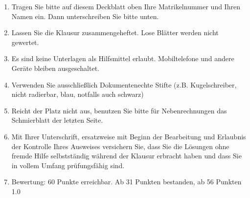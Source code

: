 		\begin{enumerate}
		\item Tragen Sie bitte auf diesem Deckblatt oben Ihre Matrikelnummer und Ihren Namen ein. Dann unterschreiben Sie bitte unten.
		\item Lassen Sie die Klausur zusammengeheftet. Lose Blätter werden nicht gewertet.
		\item Es sind keine Unterlagen als Hilfsmittel erlaubt. Mobiltelefone und andere Geräte bleiben ausgeschaltet.
		\item Verwenden Sie ausschließlich Dokumentenechte Stifte (z.B. Kugelschreiber, nicht radierbar, blau, notfalls auch schwarz)
		\item Reicht der Platz nicht aus, benutzen Sie bitte für Nebenrechnungen das Schmierblatt der letzten Seite.
		\item Mit Ihrer Unterschrift, ersatzweise mit Beginn der Bearbeitung und Erlaubnis der Kontrolle Ihres Ausweises versichern Sie, dass Sie die Lösungen ohne fremde Hilfe selbstständig während der Klausur erbracht haben und dass Sie in vollem Umfang prüfungsfähig sind.
		\item Bewertung: 60 Punkte erreichbar.
		Ab 31 Punkten bestanden, ab 56 Punkten 1.0
		\end{enumerate}